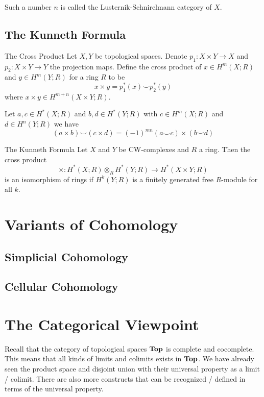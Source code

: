 \documentclass[a4paper]{article}
\begin{document}
Such a number $n$ is called the Lusternik-Schnirelmann category of $X$. 

\subsection{The Kunneth Formula}
\begin{defn}{The Cross Product}{} Let $X,Y$ be topological spaces. Denote $p_1:X\times Y\to X$ and $p_2:X\times Y\to Y$ the projection maps. Define the cross product of $x\in H^m(X;R)$ and $y\in H^m(Y;R)$ for a ring $R$ to be $$x\times y=p_1^\ast(x)\smile p_2^\ast(y)$$ where $x\times y\in H^{m+n}(X\times Y;R)$. 
\end{defn}

\begin{prp}{}{} Let $a,c\in H^\ast(X;R)$ and $b,d\in H^\ast(Y;R)$ with $c\in H^m(X;R)$ and $d\in H^n(Y;R)$ we have $$(a\times b)\smile(c\times d)=(-1)^{mn}(a\smile c)\times(b\smile d)$$
\end{prp}

\begin{thm}{The Kunneth Formula}{} Let $X$ and $Y$ be CW-complexes and $R$ a ring. Then the cross product $$\times:H^\ast(X;R)\otimes_R H^\ast(Y;R)\to H^\ast(X\times Y;R)$$ is an isomorphism of rings if $H^k(Y;R)$ is a finitely generated free $R$-module for all $k$. 
\end{thm}

\pagebreak
\section{Variants of Cohomology}
\subsection{Simplicial Cohomology}

\subsection{Cellular Cohomology}

\pagebreak
\section{The Categorical Viewpoint}
Recall that the category of topological spaces $\bold{Top}$ is complete and cocomplete. This means that all kinds of limits and colimits exists in $\bold{Top}$. We have already seen the product space and disjoint union with their universal property as a limit / colimit. There are also more constructs that can be recognized / defined in terms of the universal property. 
\end{document}
